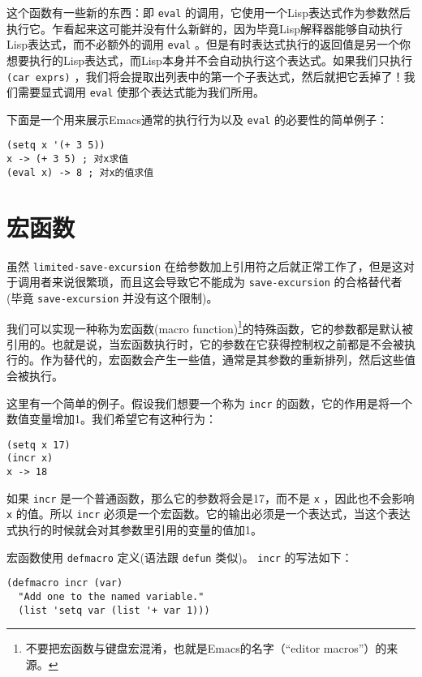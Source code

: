 这个函数有一些新的东西：即 \texttt{eval} 的调用，它使用一个Lisp表达式作为参数然后执行它。乍看起来这可能并没有什么新鲜的，因为毕竟Lisp解释器能够自动执行Lisp表达式，而不必额外的调用 \texttt{eval} 。但是有时表达式执行的返回值是另一个你想要执行的Lisp表达式，而Lisp本身并不会自动执行这个表达式。如果我们只执行 \texttt{(car exprs)} ，我们将会提取出列表中的第一个子表达式，然后就把它丢掉了！我们需要显式调用 \texttt{eval} 使那个表达式能为我们所用。

下面是一个用来展示Emacs通常的执行行为以及 \texttt{eval} 的必要性的简单例子：

\begin{verbatim}
(setq x '(+ 3 5))
x -> (+ 3 5) ; 对x求值
(eval x) -> 8 ; 对x的值求值
\end{verbatim}

\section{宏函数}
\label{section:08-Macro-Functions}

虽然 \texttt{limited-save-excursion} 在给参数加上引用符之后就正常工作了，但是这对于调用者来说很繁琐，而且这会导致它不能成为 \texttt{save-excursion} 的合格替代者(毕竟 \texttt{save-excursion} 并没有这个限制)。

我们可以实现一种称为宏函数(macro function)\footnote{不要把宏函数与键盘宏混淆，也就是Emacs的名字（“editor macros”）的来源。}的特殊函数，它的参数都是默认被引用的。也就是说，当宏函数执行时，它的参数在它获得控制权之前都是不会被执行的。作为替代的，宏函数会产生一些值，通常是其参数的重新排列，然后这些值会被执行。

这里有一个简单的例子。假设我们想要一个称为 \texttt{incr} 的函数，它的作用是将一个数值变量增加1。我们希望它有这种行为：

\begin{verbatim}
(setq x 17)
(incr x)
x -> 18
\end{verbatim}

如果 \texttt{incr} 是一个普通函数，那么它的参数将会是17，而不是 \texttt{x} ，因此也不会影响 \texttt{x} 的值。所以 \texttt{incr} 必须是一个宏函数。它的输出必须是一个表达式，当这个表达式执行的时候就会对其参数里引用的变量的值加1。

宏函数使用 \texttt{defmacro} 定义(语法跟 \texttt{defun} 类似)。 \texttt{incr} 的写法如下：

\begin{verbatim}
(defmacro incr (var)
  "Add one to the named variable."
  (list 'setq var (list '+ var 1)))
\end{verbatim}

